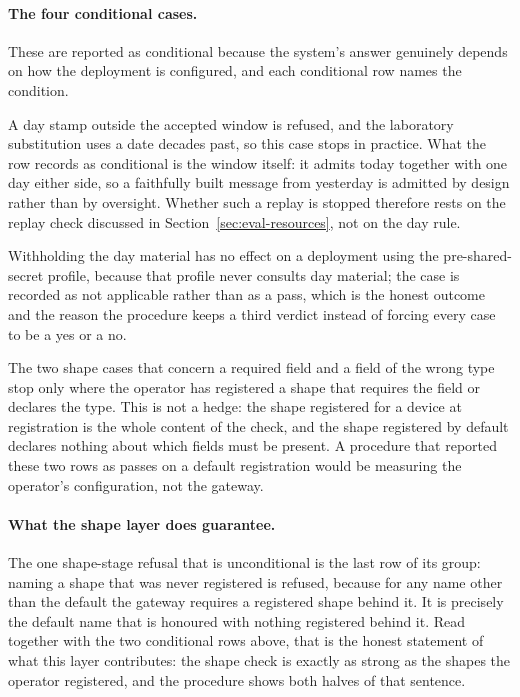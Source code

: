 \documentclass[12pt,a4paper]{report}
\begin{document}
\paragraph{The four conditional cases.}
These are reported as conditional because the system's
answer genuinely depends on how the deployment is
configured, and each conditional row names the condition.

A day stamp outside the accepted window is refused, and the
laboratory substitution uses a date decades past, so this
case stops in practice. What the row records as conditional
is the window itself: it admits today together with one day
either side, so a faithfully built message from yesterday is
admitted by design rather than by oversight. Whether such a
replay is stopped therefore rests on the replay check
discussed in Section~\ref{sec:eval-resources}, not on the
day rule.

Withholding the day material has no effect on a deployment
using the pre-shared-secret profile, because that profile
never consults day material; the case is recorded as not
applicable rather than as a pass, which is the honest
outcome and the reason the procedure keeps a third verdict
instead of forcing every case to be a yes or a no.

The two shape cases that concern a required field and a
field of the wrong type stop only where the operator has
registered a shape that requires the field or declares the
type. This is not a hedge: the shape registered for a device
at registration is the whole content of the check, and the
shape registered by default declares nothing about which
fields must be present. A procedure that reported these two
rows as passes on a default registration would be measuring
the operator's configuration, not the gateway.

\paragraph{What the shape layer does guarantee.}
The one shape-stage refusal that is unconditional is the
last row of its group: naming a shape that was never
registered is refused, because for any name other than the
default the gateway requires a registered shape behind it.
It is precisely the default name that is honoured with
nothing registered behind it. Read together with the two
conditional rows above, that is the honest statement of what
this layer contributes: the shape check is exactly as strong
as the shapes the operator registered, and the procedure
shows both halves of that sentence.
\end{document}
